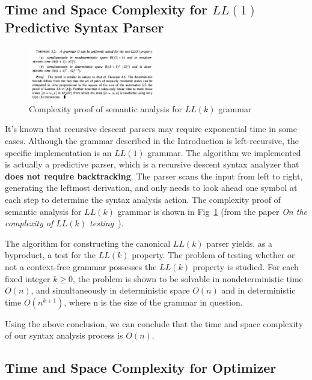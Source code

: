\documentclass[a4paper,oneside]{book}
\begin{document}
\subsection{Time and Space Complexity for $LL(1)$ Predictive Syntax Parser}

\begin{figure}
    \caption{Complexity proof of semantic analysis for $LL(k)$ grammar}\label{fig:complexity}
    \centering
    \includegraphics[width=0.5\textwidth]{src/proof.png}
\end{figure}

It's known that recursive descent parsers may require exponential time in some cases. Although the grammar described in the Introduction is left-recursive, the specific implementation is an $LL(1)$ grammar. The algorithm we implemented is actually a predictive parser, which is a recursive descent syntax analyzer that \textbf{does not require backtracking}. The parser scans the input from left to right, generating the leftmost derivation, and only needs to look ahead one symbol at each step to determine the syntax analysis action. The complexity proof of semantic analysis for $LL(k)$ grammar is shown in Fig~\ref{fig:complexity} (from the paper \textit{On the complexity of $LL(k)$ testing}~\cite{SIPPU1983244}).

\begin{displayquote}
    The algorithm for constructing the canonical $LL(k)$
    parser yields, as a byproduct, a test for the $LL(k)$ property. The problem of testing whether or not a context-free grammar possesses the $LL(k)$ property is studied. For each fixed integer $k \geq 0$, the problem is shown to be solvable in nondeterministic time $O(n)$, and simultaneously in deterministic space $O(n)$ and in deterministic time $O(n^{k+1})$, where n is the size of the grammar in question.
\end{displayquote}

Using the above conclusion, we can conclude that the time and space complexity of our syntax analysis process is $O(n)$.

\subsection{Time and Space Complexity for Optimizer}
\end{document}
